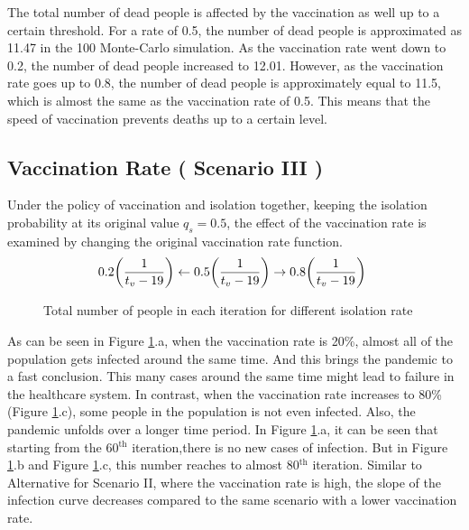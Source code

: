 \documentclass{article}
\begin{document}
The total number of dead people is affected by the vaccination as well up to a certain threshold. For a rate of 0.5, the number of dead people is approximated as 11.47 in the 100 Monte-Carlo simulation. As the vaccination rate went down to 0.2, the number of dead people increased to 12.01. However, as the vaccination rate goes up to 0.8, the number of dead people is approximately equal to 11.5, which is almost the same as the vaccination rate of 0.5. This means that the speed of vaccination prevents deaths up to a certain level. 

\newpage

\subsection*{Vaccination Rate ( Scenario III )}
\; \; Under the policy of vaccination and isolation together, keeping the isolation probability at its original value $q_s=0.5$, the effect of the vaccination rate is examined by changing the original vaccination rate function. 
$$
\\0.2\bigg(\frac{1}{t_v-19}\bigg)\leftarrow0.5\bigg(\frac{1}{t_v-19}\bigg)\rightarrow 0.8\bigg(\frac{1}{t_v-19}\bigg)\
$$

\begin{figure}[h]
    \centering
    \qquad
    \qquad
    \caption{Total number of people in each iteration for different isolation rate}
    \label{fig:AlterDelta3SC3all}%
\end{figure}

As can be seen in Figure \ref{fig:AlterDelta3SC3all}.a, when the vaccination rate is 20\%, almost all of the population gets infected around the same time. And this brings the pandemic to a fast conclusion. This many cases around the same time might lead to failure in the healthcare system. In contrast, when the vaccination rate increases to 80\% (Figure \ref{fig:AlterDelta3SC3all}.c), some people in the population is not even infected. Also, the pandemic unfolds over a longer time period. In Figure \ref{fig:AlterDelta3SC3all}.a, it can be seen that starting from the 60$^{\textrm{th}}$ iteration,there is no new cases of infection. But in Figure \ref{fig:AlterDelta3SC3all}.b and Figure \ref{fig:AlterDelta3SC3all}.c, this number reaches to almost 80$^{\textrm{th}}$ iteration. Similar to Alternative for Scenario II, where the vaccination rate is high, the slope of the infection curve decreases compared to the same scenario with a lower vaccination rate.
\end{document}
